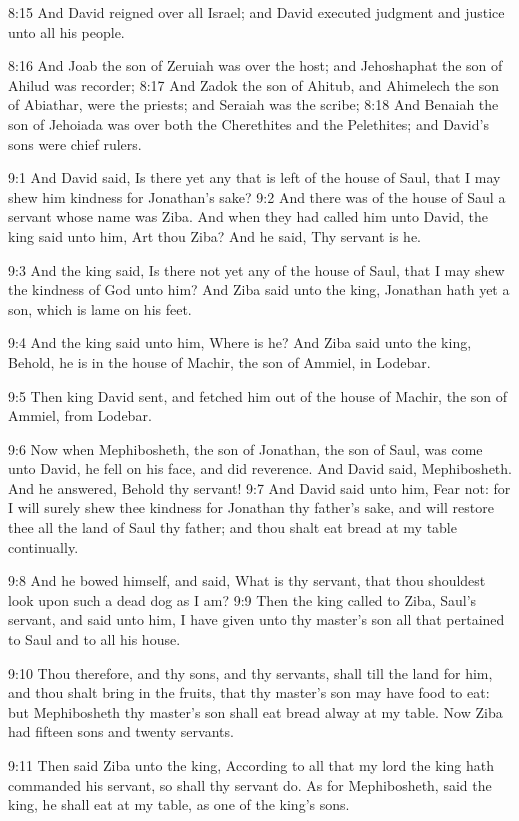 8:15 And David reigned over all Israel; and David executed judgment and justice unto all his people.

8:16 And Joab the son of Zeruiah was over the host; and Jehoshaphat the son of Ahilud was recorder; 8:17 And Zadok the son of Ahitub, and Ahimelech the son of Abiathar, were the priests; and Seraiah was the scribe; 8:18 And Benaiah the son of Jehoiada was over both the Cherethites and the Pelethites; and David's sons were chief rulers.

9:1 And David said, Is there yet any that is left of the house of Saul, that I may shew him kindness for Jonathan's sake?  9:2 And there was of the house of Saul a servant whose name was Ziba. And when they had called him unto David, the king said unto him, Art thou Ziba?  And he said, Thy servant is he.

9:3 And the king said, Is there not yet any of the house of Saul, that I may shew the kindness of God unto him? And Ziba said unto the king, Jonathan hath yet a son, which is lame on his feet.

9:4 And the king said unto him, Where is he? And Ziba said unto the king, Behold, he is in the house of Machir, the son of Ammiel, in Lodebar.

9:5 Then king David sent, and fetched him out of the house of Machir, the son of Ammiel, from Lodebar.

9:6 Now when Mephibosheth, the son of Jonathan, the son of Saul, was come unto David, he fell on his face, and did reverence. And David said, Mephibosheth. And he answered, Behold thy servant!  9:7 And David said unto him, Fear not: for I will surely shew thee kindness for Jonathan thy father's sake, and will restore thee all the land of Saul thy father; and thou shalt eat bread at my table continually.

9:8 And he bowed himself, and said, What is thy servant, that thou shouldest look upon such a dead dog as I am?  9:9 Then the king called to Ziba, Saul's servant, and said unto him, I have given unto thy master's son all that pertained to Saul and to all his house.

9:10 Thou therefore, and thy sons, and thy servants, shall till the land for him, and thou shalt bring in the fruits, that thy master's son may have food to eat: but Mephibosheth thy master's son shall eat bread alway at my table. Now Ziba had fifteen sons and twenty servants.

9:11 Then said Ziba unto the king, According to all that my lord the king hath commanded his servant, so shall thy servant do. As for Mephibosheth, said the king, he shall eat at my table, as one of the king's sons.

